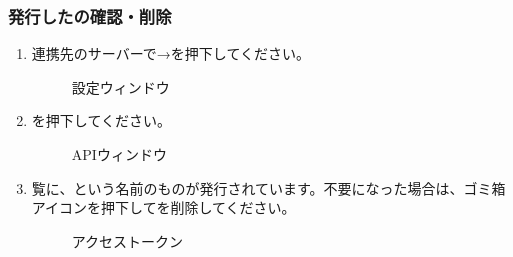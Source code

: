         \subsubsection{発行した\accessToken の確認・削除}
        \label{sec:misskey4}
            \begin{enumerate}
                \item 連携先の\mi サーバーで→を押下してください。
                    \begin{figure}[htbp]
                        \centering
                        \caption{設定ウィンドウ}
                        \label{img:misskey8}
                    \end{figure}

                \item {}を押下してください。
                    \begin{figure}[htbp]
                        \centering
                        \caption{APIウィンドウ}
                        \label{img:misskey9}
                    \end{figure}

                \item \accessToken 覧に、\bj という名前のものが発行されています。不要になった場合は、ゴミ箱アイコンを押下して\accessToken を削除してください。
                    \begin{figure}[htbp]
                        \centering
                        \caption{アクセストークン}
                        \label{img:misskey10}
                    \end{figure}
            \end{enumerate}